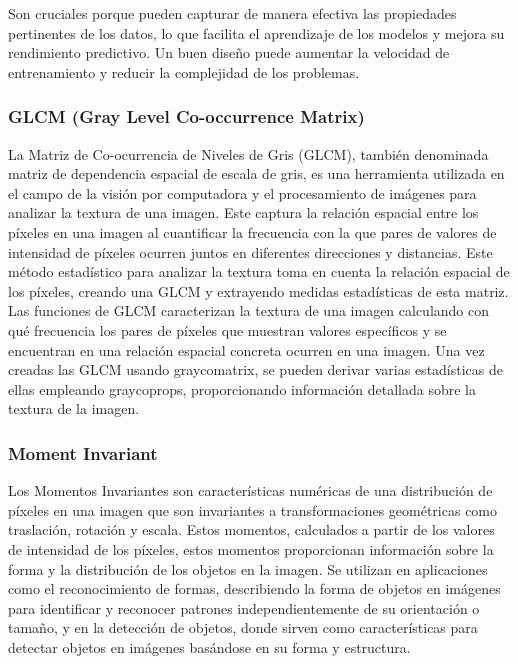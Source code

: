 Son cruciales porque pueden capturar de manera efectiva las propiedades pertinentes de los datos, lo que facilita el aprendizaje de los modelos y mejora su rendimiento predictivo. Un buen diseño puede aumentar la velocidad de entrenamiento y reducir la complejidad de los problemas.


\subsubsection{GLCM (Gray Level Co-occurrence Matrix)}

La Matriz de Co-ocurrencia de Niveles de Gris (GLCM), también denominada matriz de dependencia espacial de escala de gris, es una herramienta utilizada en el campo de la visión por computadora y el procesamiento de imágenes para analizar la textura de una imagen. Este captura la relación espacial entre los píxeles en una imagen al cuantificar la frecuencia con la que pares de valores de intensidad de píxeles ocurren juntos en diferentes direcciones y distancias. Este método estadístico para analizar la textura toma en cuenta la relación espacial de los píxeles, creando una GLCM y extrayendo medidas estadísticas de esta matriz. Las funciones de GLCM caracterizan la textura de una imagen calculando con qué frecuencia los pares de píxeles que muestran valores específicos y se encuentran en una relación espacial concreta ocurren en una imagen. Una vez creadas las GLCM usando graycomatrix, se pueden derivar varias estadísticas de ellas empleando graycoprops, proporcionando información detallada sobre la textura de la imagen.
\parencite{mathworksAnxE1lisisTextura}

\subsubsection{Moment Invariant}

Los Momentos Invariantes son características numéricas de una distribución de píxeles en una imagen que son invariantes a transformaciones geométricas como traslación, rotación y escala. Estos momentos, calculados a partir de los valores de intensidad de los píxeles, estos momentos proporcionan información sobre la forma y la distribución de los objetos en la imagen. Se utilizan en aplicaciones como el reconocimiento de formas, describiendo la forma de objetos en imágenes para identificar y reconocer patrones independientemente de su orientación o tamaño, y en la detección de objetos, donde sirven como características para detectar objetos en imágenes basándose en su forma y estructura.


